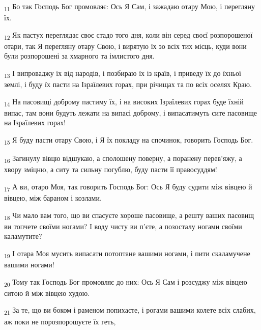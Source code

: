 \begin{tcolorbox}
\textsubscript{11} Бо так Господь Бог промовляє: Ось Я Сам, і зажадаю отару Мою, і перегляну їх.
\end{tcolorbox}
\begin{tcolorbox}
\textsubscript{12} Як пастух переглядає своє стадо того дня, коли він серед своєї розпорошеної отари, так Я перегляну отару Свою, і вирятую їх зо всіх тих місць, куди вони були розпорошені за хмарного та імлистого дня.
\end{tcolorbox}
\begin{tcolorbox}
\textsubscript{13} І випроваджу їх від народів, і позбираю їх із країв, і приведу їх до їхньої землі, і буду їх пасти на Ізраїлевих горах, при річищах та по всіх оселях Краю.
\end{tcolorbox}
\begin{tcolorbox}
\textsubscript{14} На пасовищі доброму пастиму їх, і на високих Ізраїлевих горах буде їхній випас, там вони будуть лежати на випасі доброму, і випасатимуть сите пасовище на Ізраїлевих горах!
\end{tcolorbox}
\begin{tcolorbox}
\textsubscript{15} Я буду пасти отару Свою, і Я їх покладу на спочинок, говорить Господь Бог.
\end{tcolorbox}
\begin{tcolorbox}
\textsubscript{16} Загинулу вівцю відшукаю, а сполошену поверну, а поранену перев'яжу, а хвору зміцню, а ситу та сильну погублю, буду пасти її правосуддям!
\end{tcolorbox}
\begin{tcolorbox}
\textsubscript{17} А ви, отаро Моя, так говорить Господь Бог: Ось Я буду судити між вівцею й вівцею, між бараном і козлами.
\end{tcolorbox}
\begin{tcolorbox}
\textsubscript{18} Чи мало вам того, що ви спасуєте хороше пасовище, а решту ваших пасовищ ви топчете своїми ногами? І воду чисту ви п'єте, а позосталу ногами своїми каламутите?
\end{tcolorbox}
\begin{tcolorbox}
\textsubscript{19} І отара Моя мусить випасати потоптане вашими ногами, і пити скаламучене вашими ногами!
\end{tcolorbox}
\begin{tcolorbox}
\textsubscript{20} Тому так Господь Бог промовляє до них: Ось Я Сам і розсуджу між вівцею ситою й між вівцею худою.
\end{tcolorbox}
\begin{tcolorbox}
\textsubscript{21} За те, що ви боком і раменом попихаєте, і рогами вашими колете всіх слабих, аж поки не порозпорошуєте їх геть,
\end{tcolorbox}
